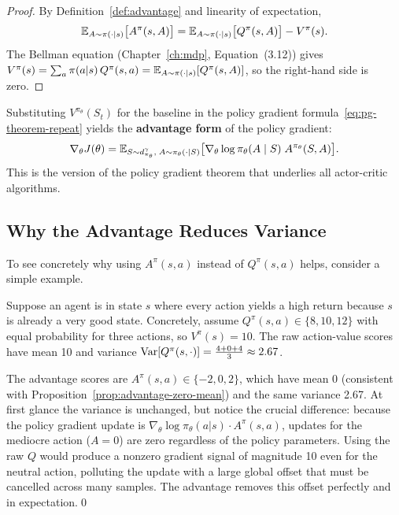 \begin{proof}
By Definition~\ref{def:advantage} and linearity of expectation,
\[
\operatorname{\mathbb{E}}_{A \sim \pi(\cdot|s)}\bigl[A^\pi(s, A)\bigr]
= \operatorname{\mathbb{E}}_{A \sim \pi(\cdot|s)}\bigl[Q^\pi(s, A)\bigr] - V^\pi(s).
\]
The Bellman equation (Chapter~\ref{ch:mdp}, Equation~(3.12)) gives
$V^\pi(s) = \sum_a \pi(a|s)\,Q^\pi(s,a)
           = \operatorname{\mathbb{E}}_{A \sim \pi(\cdot|s)}[Q^\pi(s,A)]$,
so the right-hand side is zero.
\end{proof}

Substituting $V^{\pi_\theta}(S_t)$ for the baseline in the policy gradient
formula~\eqref{eq:pg-theorem-repeat} yields the \textbf{advantage form} of
the policy gradient:
\begin{equation}
\label{eq:advantage-pg}
\nabla_\theta J(\theta)
= \operatorname{\mathbb{E}}_{S \sim d^\gamma_{\pi_\theta},\; A \sim \pi_\theta(\cdot|S)}
  \bigl[\nabla_\theta \log \pi_\theta(A \mid S)\; A^{\pi_\theta}(S, A)\bigr].
\end{equation}
This is the version of the policy gradient theorem that underlies all
actor-critic algorithms.

\subsection{Why the Advantage Reduces Variance}

To see concretely why using $A^\pi(s,a)$ instead of $Q^\pi(s,a)$ helps,
consider a simple example.

\begin{example}
\label{ex:advantage-variance}
Suppose an agent is in state $s$ where every action yields a high return
because $s$ is already a very good state.  Concretely, assume
$Q^\pi(s, a) \in \{8, 10, 12\}$ with equal probability for three actions,
so $V^\pi(s) = 10$.  The raw action-value scores have mean 10 and variance
$\operatorname{Var}[Q^\pi(s,\cdot)] = \frac{4+0+4}{3} \approx 2.67$.

The advantage scores are $A^\pi(s,a) \in \{-2, 0, 2\}$, which have mean 0
(consistent with Proposition~\ref{prop:advantage-zero-mean}) and the same
variance 2.67.  At first glance the variance is unchanged, but notice the
crucial difference: because the policy gradient update is
$\nabla_\theta \log \pi_\theta(a|s) \cdot A^\pi(s,a)$, updates for the
mediocre action ($A = 0$) are zero regardless of the policy parameters.
Using the raw $Q$ would produce a nonzero gradient signal of magnitude 10
even for the neutral action, polluting the update with a large global
offset that must be cancelled across many samples.  The advantage removes
this offset perfectly and in expectation.\qed
\end{example}

